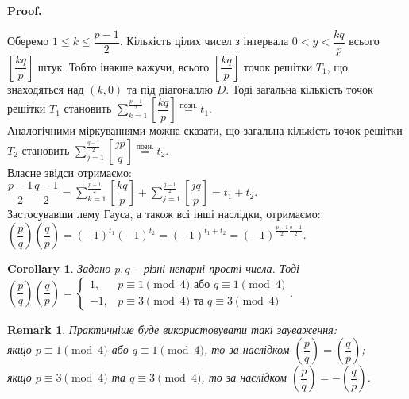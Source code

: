 \documentclass[a4paper, 10pt]{article}
\makeatletter
\theoremstyle{theoremdd}
\theoremstyle{theoremdd}
\theoremstyle{theoremdd}
\theoremstyle{theoremdd}
\theoremstyle{theoremdd}
\theoremstyle{theoremdd}
\newtheorem{remark}[theorem]{Remark}
\theoremstyle{theoremdd}
\theoremstyle{theoremdd}
\newtheorem{corollary}[theorem]{Corollary}
\renewenvironment{proof}[1][Proof.\\]{\par
\pushQED{\hfill \qed}%
\normalfont \topsep6\p@\@plus6\p@\relax
\trivlist
\item\relax
{\bfseries
#1\@addpunct{.}}\hspace\labelsep\ignorespaces
}{%
\popQED\endtrivlist\@endpefalse
}
\makeatother
\begin{document}
\begin{proof}
\begin{figure}[H]
\end{figure}
Оберемо $1 \leq k \leq \dfrac{p-1}{2}$. Кількість цілих чисел з інтервала $0 < y < \dfrac{kq}{p}$ всього $\left[ \dfrac{kq}{p} \right]$ штук. Тобто інакше кажучи, всього $\left[ \dfrac{kq}{p} \right]$ точок решітки $T_1$, що знаходяться над $(k,0)$ та під діагоналлю $D$. Тоді загальна кількість точок решітки $T_1$ становить $\displaystyle\sum_{k=1}^{\frac{p-1}{2}} \left[ \dfrac{kq}{p} \right] \overset{\text{позн.}}{=} t_1$.\\
Аналогічними міркуваннями можна сказати, що загальна кількість точок решітки $T_2$ становить $\displaystyle\sum_{j=1}^{\frac{q-1}{2}} \left[ \dfrac{jp}{q} \right] \overset{\text{позн.}}{=} t_2$.\\
Власне звідси отримаємо:\\
$\dfrac{p-1}{2} \dfrac{q-1}{2} = \displaystyle\sum_{k=1}^{\frac{p-1}{2}} \left[ \dfrac{kq}{p} \right] + \sum_{j=1}^{\frac{q-1}{2}} \left[ \dfrac{jq}{p} \right] = t_1 + t_2$.\\
Застосувавши лему Гауса, а також всі інші наслідки, отримаємо:\\
$\left( \dfrac{p}{q} \right) \left( \dfrac{q}{p} \right) = (-1)^{t_1} (-1)^{t_2} = (-1)^{t_1+t_2} = (-1)^{\textstyle\frac{p-1}{2} \frac{q-1}{2}}$.
\end{proof}

\begin{corollary}
Задано $p,q$ -- різні непарні прості числа. Тоді\\
$\left( \dfrac{p}{q} \right) \left( \dfrac{q}{p} \right) = \begin{cases} 1, & p \equiv 1 \pmod 4 \text{ або } q \equiv 1 \pmod 4 \\ -1, & p \equiv 3 \pmod 4 \text{ та } q \equiv 3 \pmod 4 \end{cases}$.
\end{corollary}

\begin{remark}
Практичніше буде використовувати такі зауваження:\\
якщо $p \equiv 1 \pmod 4$ або $q \equiv 1 \pmod 4$, то за наслідком $\left( \dfrac{p}{q} \right) = \left( \dfrac{q}{p} \right)$;\\
якщо $p \equiv 3 \pmod 4$ та $q \equiv 3 \pmod 4$, то за наслідком $\left( \dfrac{p}{q} \right) = -\left( \dfrac{q}{p} \right)$.
\end{remark}
\end{document}
